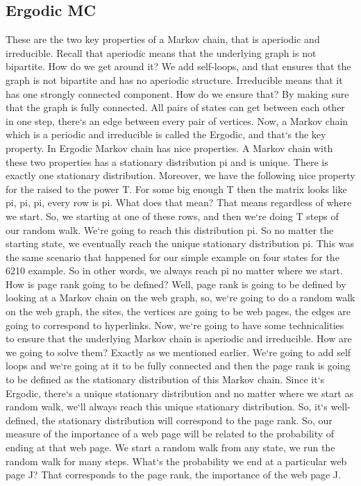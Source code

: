 \subsection{Ergodic MC}
These are the two key properties of a Markov chain, that is aperiodic and irreducible.
Recall that aperiodic means that the underlying graph is not bipartite.
How do we get around it? We add self-loops, and that ensures that the graph is not bipartite and has no aperiodic structure.
Irreducible means that it has one strongly connected component.
How do we ensure that? By making sure that the graph is fully connected.
All pairs of states can get between each other in one step, there`s an edge between every pair of vertices.
Now, a Markov chain which is a periodic and irreducible is called the Ergodic, and that`s the key property.
In Ergodic Markov chain has nice properties.
A Markov chain with these two properties has a stationary distribution pi and is unique.
There is exactly one stationary distribution.
Moreover, we have the following nice property for the raised to the power T\@.
For some big enough T then the matrix looks like pi, pi, pi, every row is pi.
What does that mean? That means regardless of where we start.
So, we starting at one of these rows, and then we`re doing T steps of our random walk.
We`re going to reach this distribution pi.
So no matter the starting state, we eventually reach the unique stationary distribution pi.
This was the same scenario that happened for our simple example on four states for the 6210 example.
So in other words, we always reach pi no matter where we start.
How is page rank going to be defined? Well, page rank is going to be defined by looking at a Markov chain on the web graph, so, we`re going to do a random walk on the web graph, the sites, the vertices are going to be web pages, the edges are going to correspond to hyperlinks.
Now, we`re going to have some technicalities to ensure that the underlying Markov chain is aperiodic and irreducible.
How are we going to solve them? Exactly as we mentioned earlier.
We`re going to add self loops and we`re going at it to be fully connected and then the page rank is going to be defined as the stationary distribution of this Markov chain.
Since it`s Ergodic, there`s a unique stationary distribution and no matter where we start as random walk, we`ll always reach this unique stationary distribution.
So, it`s well-defined, the stationary distribution will correspond to the page rank.
So, our measure of the importance of a web page will be related to the probability of ending at that web page.
We start a random walk from any state, we run the random walk for many steps.
What`s the probability we end at a particular web page J? That corresponds to the page rank, the importance of the web page J\@.

